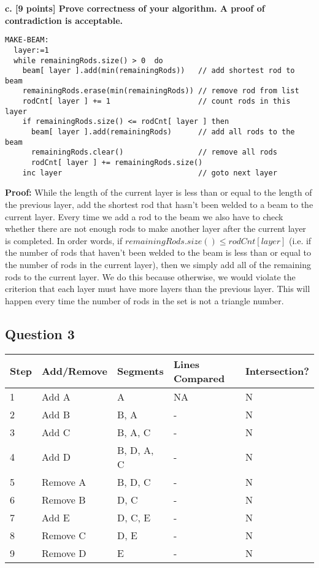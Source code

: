 \documentclass[12pt]{article}
\begin{document}
\newpage
\noindent \textbf{c. [9 points] Prove correctness of your algorithm. A proof of contradiction is acceptable.}
\begin{lstlisting}[frame=single]
MAKE-BEAM:
  layer:=1                                                        
  while remainingRods.size() > 0  do 
    beam[ layer ].add(min(remainingRods))   // add shortest rod to beam
    remainingRods.erase(min(remainingRods)) // remove rod from list
    rodCnt[ layer ] += 1                    // count rods in this layer
    if remainingRods.size() <= rodCnt[ layer ] then
      beam[ layer ].add(remainingRods)      // add all rods to the beam
      remainingRods.clear()                 // remove all rods 
      rodCnt[ layer ] += remainingRods.size()
    inc layer                               // goto next layer
\end{lstlisting}

\textbf{Proof: } While the length of the current layer is less than or
equal to the length of the previous layer, add the shortest rod that hasn't 
been welded to a beam to the current layer. 
Every time we add a rod to the beam we also have to check whether there 
are not enough rods to make another layer after the current layer is completed. 
In order words, if $ remainingRods.size() \le rodCnt[ layer ] $
(i.e. if the number of rods that haven't been welded to the beam is less than 
or equal to the number of rods in the current layer), 
then we simply add all of the 
remaining rods to the current layer. We do this because otherwise, we would 
violate the criterion that each layer must have more layers than the 
previous layer. 
This will happen every time the number of rods in the set is not a triangle 
number.


\subsection*{Question 3}

\begin{center}
  \begin{tabular}{ | l | l | l | l | l | }
    \hline
    Step & Add/Remove & Segments   & Lines Compared & Intersection? \\ \hline
    1    & Add A       & A          & NA    & N \\ \hline
    2    & Add B       & B, A       & -     & N \\ \hline
    3    & Add C       & B, A, C    & -     & N \\ \hline
    4    & Add D       & B, D, A, C & -     & N \\ \hline
    5    & Remove A    & B, D, C    & -     & N \\ \hline
    6    & Remove B    & D, C       & -     & N \\ \hline
    7    & Add E       & D, C, E    & -     & N \\ \hline
    8    & Remove C    & D, E       & -     & N \\ \hline
    9    & Remove D    & E          & -     & N \\ \hline
  \end{tabular}
\end{center}
\end{document}
